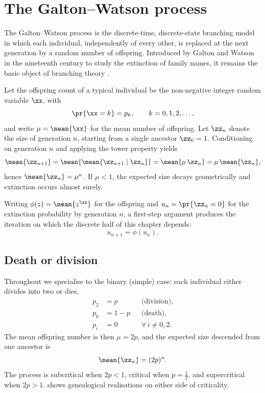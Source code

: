 \section{The Galton--Watson process}
\label{sec:gw}

The Galton--Watson process is the discrete-time, discrete-state branching model in which each individual, independently of every other, is replaced at the next generation by a random number of offspring. Introduced by Galton and Watson in the nineteenth century to study the extinction of family names, it remains the basic object of branching theory \cite{Athreya1972,Harris1963}.

Let the offspring count of a typical individual be the non-negative integer random variable \(\xx\), with
\begin{equation*}
\pr{\xx = k} = p_k,\qquad k = 0,1,2,\dots,
\end{equation*}
and write \(\mu = \mean{\xx}\) for the mean number of offspring. Let \(\zz_n\) denote the size of generation \(n\), starting from a single ancestor \(\zz_0=1\). Conditioning on generation \(n\) and applying the tower property yields
\begin{equation*}
\mean{\zz_{n+1}} = \mean{\mean{\zz_{n+1}\mid \zz_n}} = \mean{\mu\,\zz_n} = \mu\,\mean{\zz_n},
\end{equation*}
hence \(\mean{\zz_n} = \mu^n\). If \(\mu<1\), the expected size decays geometrically and extinction occurs almost surely.

Writing \(\phi(z)=\mean{z^{\xx}}\) for the offspring \pgf{} and \(u_n=\pr{\zz_n=0}\) for the extinction probability by generation \(n\), a first-step argument produces the iteration on which the discrete half of this chapter depends:
\begin{equation}
\label{iterPGF}
u_{n+1} = \phi(u_n).
\end{equation}

\subsection{Death or division}
\label{sec:deathordivision}

Throughout we specialise to the binary (simple) case: each individual either divides into two or dies,
\begin{align*}
p_2 &= p &&\text{(division)},\\
p_0 &= 1-p &&\text{(death)},\\
p_i &= 0 &&\forall\, i\neq 0,2.
\end{align*}
The mean offspring number is then \(\mu=2p\), and the expected size descended from one ancestor is
\begin{equation}
\label{eq:meanZn}
\mean{\zz_n} = (2p)^n.
\end{equation}
The process is subcritical when \(2p<1\), critical when \(p=\tfrac12\), and supercritical when \(2p>1\).  shows genealogical realisations on either side of criticality.


